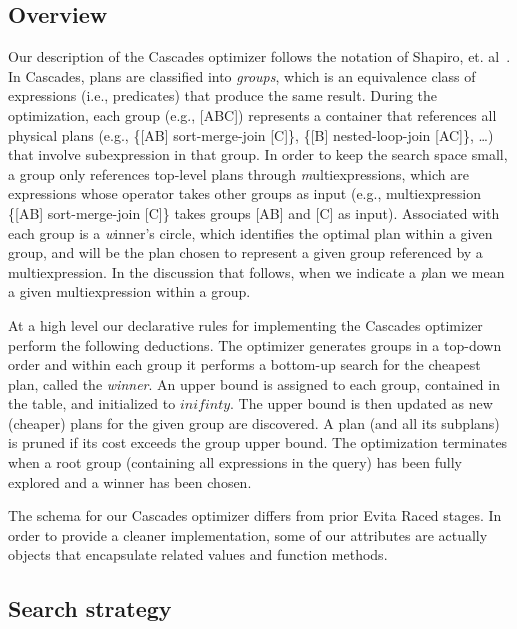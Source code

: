 \subsection{Overview}
\label{ch:opt:sec:overview}

Our description of the Cascades optimizer follows the notation of Shapiro, et.
al~\cite{Shapiro-opt}.  In Cascades, plans are classified into {\em groups},
which is an equivalence class of expressions (i.e., predicates) that produce
the same result.  During the optimization, each group (e.g., [ABC]) represents
a container that references all physical plans (e.g., \{[AB] sort-merge-join
[C]\}, \{[B] nested-loop-join [AC]\}, \ldots) that involve subexpression in
that group.  In order to keep the search space small, a group only references
top-level plans through {\emph multiexpressions}, which are expressions whose
operator takes other groups as input (e.g., multiexpression \{[AB]
sort-merge-join [C]\} takes groups [AB] and [C] as input).  Associated with
each group is a {\emph winner's circle}, which identifies the optimal plan
within a given group, and will be the plan chosen to represent a given group
referenced by a multiexpression.  In the discussion that follows, when we
indicate a {\emph plan} we mean a given multiexpression within a group.

At a high level our declarative rules for implementing the Cascades optimizer
perform the following deductions.  The optimizer generates groups in a top-down
order and within each group it performs a bottom-up search for the cheapest
plan, called the {\em winner}.  An upper bound is assigned to each group,
contained in the  table, and initialized to $inifinty$.  The upper
bound is then updated as new (cheaper) plans for the given group are
discovered.  A plan (and all its subplans) is pruned if its cost exceeds the
group upper bound.  The optimization terminates when a root group (containing
all expressions in the query) has been fully explored and a winner has been
chosen.

The schema for our Cascades optimizer differs from prior Evita Raced stages.
In order to provide a cleaner implementation, some of our attributes are
actually objects that encapsulate related values and function methods. 


\subsection{Search strategy}
\label{ch:opt:sec:cascades_search}

